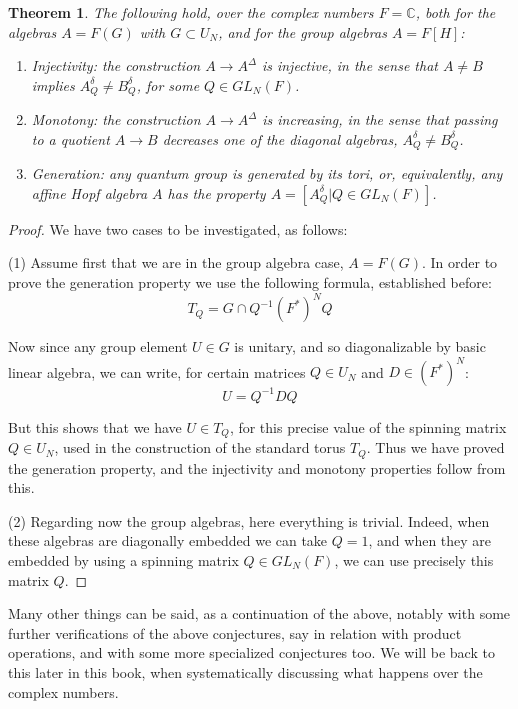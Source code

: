 \documentclass[12pt]{amsbook}
\newtheorem{theorem}{Theorem}[chapter]
\begin{document}

\begin{theorem}
The following hold, over the complex numbers $F=\mathbb C$, both for the algebras $A=F(G)$ with $G\subset U_N$, and for the group algebras $A=F[H]$:
\begin{enumerate}
\item Injectivity: the construction $A\to A^\Delta$ is injective, in the sense that $A\neq B$ implies $A^\delta_Q\neq B^\delta_Q$, for some $Q\in GL_N(F)$.

\item Monotony: the construction $A\to A^\Delta$ is increasing, in the sense that passing to a quotient $A\to B$ decreases one of the diagonal algebras, $A^\delta_Q\neq B^\delta_Q$.

\item Generation: any quantum group is generated by its tori, or, equivalently, any affine Hopf algebra $A$ has the property $A=[A^\delta_Q|Q\in GL_N(F)]$.
\end{enumerate}
\end{theorem}

\begin{proof}
We have two cases to be investigated, as follows:

\medskip

(1) Assume first that we are in the group algebra case, $A=F(G)$. In order to prove the generation property we use the following formula, established before: 
$$T_Q=G\cap Q^{-1}(F^*)^NQ$$

Now since any group element $U\in G$ is unitary, and so diagonalizable by basic linear algebra, we can write, for certain matrices $Q\in U_N$ and $D\in(F^*)^N$:
$$U=Q^{-1}DQ$$

But this shows that we have $U\in T_Q$, for this precise value of the spinning matrix $Q\in U_N$, used in the construction of the standard torus $T_Q$. Thus we have proved the generation property, and the injectivity and monotony properties follow from this.

\medskip

(2) Regarding now the group algebras, here everything is trivial. Indeed, when these algebras are diagonally embedded we can take $Q=1$, and when they are embedded by using a spinning matrix $Q\in GL_N(F)$, we can use precisely this matrix $Q$.
\end{proof}

Many other things can be said, as a continuation of the above, notably with some further verifications of the above conjectures, say in relation with product operations, and with some more specialized conjectures too. We will be back to this later in this book, when systematically discussing what happens over the complex numbers.
\end{document}
